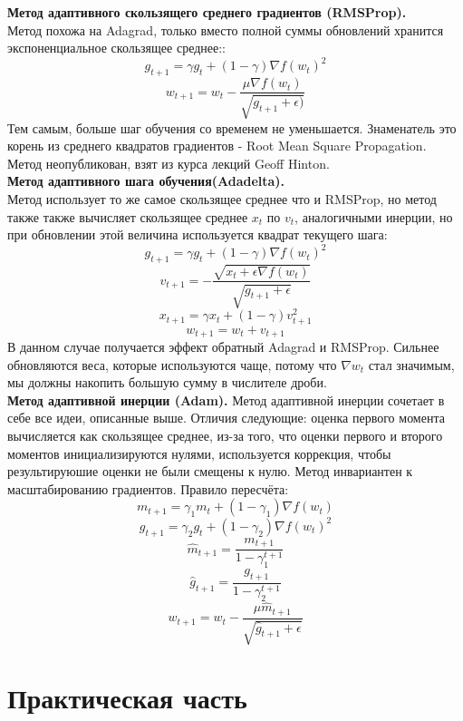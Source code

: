 \documentclass[oneside,final,14pt]{extreport}
\begin{document}
\textbf{Метод адаптивного скользящего среднего градиентов (RMSProp).\cite{bib:rmsprop}}\\
Метод похожа на Adagrad, только вместо полной суммы обновлений хранится экспоненциальное скользящее среднее::
\[g_{t+1} = \gamma g_t + (1-\gamma) \nabla f(w_t)^2 \]
\[w_{t+1} = w_t - \frac{\mu \nabla f(w_t) }{\sqrt{g_{t+1} + \epsilon)} }  \] 
Тем самым, больше шаг обучения со временем не уменьшается. Знаменатель это корень из среднего квадратов градиентов - Root Mean Square Propagation. Метод неопубликован, взят из курса лекций Geoff Hinton.\\
\textbf{Метод адаптивного шага обучения(Adadelta).\cite{bib:adadelta}}\\
Метод использует то же самое скользящее среднее что и RMSProp, но метод также также вычисляет скользящее среднее \(x_t\) по \(v_t\), аналогичными инерции, но при обновлении этой величина используется квадрат текущего шага:
\[g_{t+1} = \gamma g_t + (1-\gamma) \nabla f(w_t)^2 \]
\[v_{t+1} = - \frac{\sqrt{x_t + \epsilon \nabla f(w_t)}}{\sqrt{g_{t+1}+ \epsilon}}\]
\[x_{t+1} = \gamma x_t + (1 - \gamma) v^2_{t+1} \]
\[w_{t+1} = w_t + v_{t+1} \]
В данном случае получается эффект обратный Adagrad и RMSProp. Сильнее обновляются веса, которые используются чаще, потому что \(\nabla  w_t\) стал значимым, мы должны накопить большую сумму в числителе дроби. 
\\
\textbf{Метод адаптивной инерции (Adam).\cite{bib:adam}}
Метод адаптивной инерции сочетает в себе все идеи, описанные выше. Отличия следующие: оценка первого момента вычисляется как скользящее среднее, из-за того, что оценки первого и второго моментов инициализируются нулями, используется коррекция, чтобы результируюшие оценки не были смещены к нулю. Метод инвариантен к масштабированию градиентов. Правило пересчёта: 
\[m_{t+1} = \gamma_1 m_t + (1-\gamma_1) \nabla f(w_t) \]
\[g_{t+1} = \gamma_2 g_t + (1-\gamma_2) \nabla f(w_t)^2 \]
\[\hat{m}_{t+1} = \frac{m_{t+1}}{1 - \gamma^{t+1}_1} \]
\[\hat{g}_{t+1} = \frac{g_{t+1}}{1 - \gamma^{t+1}_2} \]
\[w_{t+1} = w_t - \frac{\mu \hat{m}_{t+1}}{\sqrt{\hat{g}_{t+1} + \epsilon}}\]



\chapter{Практическая часть}
\end{document}
